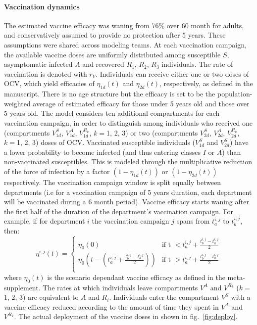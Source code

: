 \paragraph{Vaccination dynamics} The estimated vaccine efficacy was waning from 76\% over 60 month for adults, and conservatively assumed to provide no protection after 5 years. These assumptions were shared across modeling teams. 
At each vaccination campaign, the available vaccine doses are uniformly distributed among susceptible $S$, asymptomatic infected $A$ and recovered $R_{1}$, $R_2$, $R_3$ individuals. The rate of vaccination is denoted with $r_V$. Individuals can receive either one or two doses of OCV, which yield efficacies of $\eta_{1d}(t)$ and $\eta_{2d}(t)$, respectively, as defined in the manuscript. There is no age structure but the efficacy is set to be the population-weighted average of estimated efficacy for those under 5 years old and those over 5 years old.
 The model considers ten additional compartments for each vaccination campaign, in order to distinguish among individuals who received one (compartments $V^S_{1d}$, $V^A_{1d}$, $V^{R_k}_{1d}$, $k=$1, 2, 3) or two (compartments $V^S_{2d}$, $V^A_{2d}$, $V^{R_k}_{2d}$, $k=$1, 2, 3) doses of OCV. Vaccinated susceptible individuals ($V^S_{1d}$ and $V^S_{2d}$) have a lower probability to become infected (and thus entering classes $I$ or $A$) than non-vaccinated susceptibles. This is modeled through the multiplicative reduction of the force of infection by a  factor $(1-\eta_{1d}(t))$ or $(1-\eta_{2d}(t))$ respectively.
The vaccination campaign window is split equally between departments (i.e for a vaccination campaign of 5 years duration, each department will be vaccinated during a 6 month period). Vaccine efficacy starts waning after the first half of the duration of the department's vaccination campaign. For example, if for department $i$ the vaccination campaign $j$ spans from $t^{i,j}_a$ to $t^{i,j}_b$, then:
    \begin{equation}
\eta^{i,j}(t) = \left\{
    \begin{array}{ll}
        \eta_0(0) & \mbox{if t $<  t^{i,j}_a + \frac{t^{i,j}_b - t^{i,j}_a}{2}$} \\
        \eta_0(t -  (t^{i,j}_a +  \frac{t^{i,j}_b - t^{i,j}_a}{2}) ) & \mbox{if t $>  t^{i,j}_a + \frac{t^{i,j}_b - t^{i,j}_a}{2}$} \\
    \end{array}
\right.
\end{equation}
where $\eta_0(t)$ is the scenario dependant vaccine efficacy as defined in the meta-supplement.
The rates at which individuals leave compartments $V^A$ and $V^{R_k}$ ($k=$1, 2, 3) are equivalent to $A$ and $R_i$. Individuals enter the compartment $V^S$ with a vaccine efficacy reduced according to the amount of time they spent in $V^A$ and $V^{R_k}$. The actual deployment of the vaccine doses in shown in fig.~\ref{fig:deploy}.

